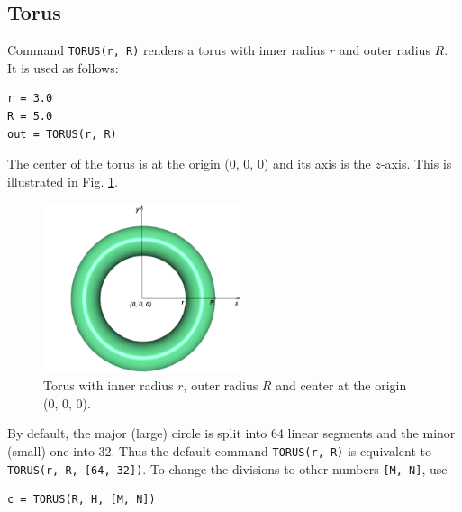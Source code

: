 \subsection{Torus}

Command {\tt TORUS(r, R)} renders a torus with inner radius $r$ and outer 
radius $R$. It is used as follows:\\

\begin{bbox}
\begin{verbatim}
r = 3.0
R = 5.0
out = TORUS(r, R)
\end{verbatim}
\end{bbox}
\vspace{6mm}

\noindent
The center of the torus is at the origin (0, 0, 0) and its axis
is the $z$-axis. This is illustrated in Fig. \ref{fig:torus-1}.

\begin{figure}[!ht]
\begin{center}
\includegraphics[width=0.52\textwidth]{img/torus-1.png}
\end{center}
\vspace{-4mm}
\caption{Torus with inner radius $r$, outer radius $R$ and center at the origin (0, 0, 0).}
\label{fig:torus-1}
\vspace{-1cm}
\end{figure}
\newpage
\noindent
By default, the major (large) circle is split into 64 linear segments and
the minor (small) one into 32. Thus the default command {\tt TORUS(r, R)} is
equivalent to {\tt TORUS(r, R, [64, 32])}. To change the divisions to other 
numbers {\tt [M, N]}, use\\

\begin{bbox}
\begin{verbatim}
c = TORUS(R, H, [M, N])
\end{verbatim}
\end{bbox}
\vspace{6mm}

